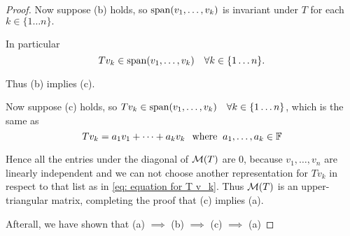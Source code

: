 \begin{proof}
  Now suppose (b) holds, so $\operatorname{span} (v_1, \ldots, v_k)$ is invariant under $T$ for each $k \in \{1 \ldots n\}.$

  In particular
  \begin{equation}
    T v_k \in \operatorname{span} (v_1, \ldots, v_k) \quad \forall k \in \{1 \ldots n\}.
  \end{equation}

  Thus (b) implies (c).

  Now suppose (c) holds, so $T v_k \in \operatorname{span} (v_1, \ldots, v_k) \quad \forall k \in \{1 \ldots n\}$, which is the same as
  \begin{equation}
    \label{eq: equation for T v_k}
    T v_k = a_1 v_1 + \cdots + a_k v_k \;\;\, \text{where}\;\; a_1, \dots, a_k \in \mathbb{F}
  \end{equation}

  Hence all the entries under the diagonal of $\mathcal{M} (T)$ are $0$, because $v_1, \ldots, v_n$ are linearly independent and we can not choose another representation for $T v_k$ in respect to that list as in \eqref{eq: equation for T v_k}. Thus $\mathcal{M}(T)$ is an upper-triangular matrix, completing the proof that (c) implies (a).

  Afterall, we have shown that (a) $\implies$ (b) $\implies$ (c) $\implies$ (a)
\end{proof}

